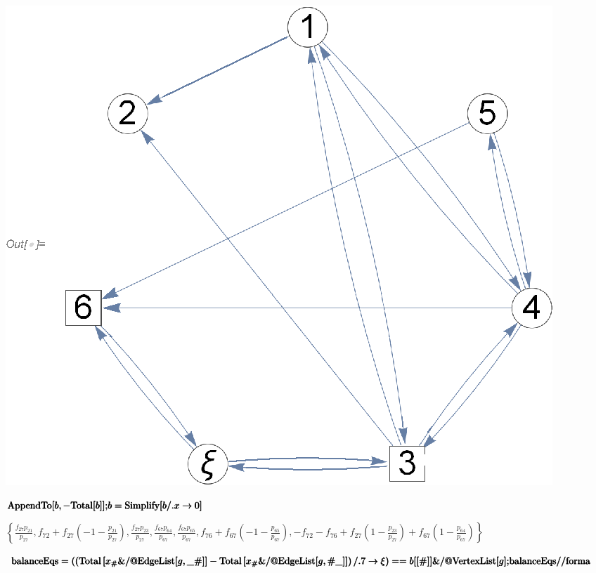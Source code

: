 \documentclass{article}
\newcommand{\unicode}[1]{{}}
\begin{document}
\includegraphics{k1_gr8.eps}

\begin{doublespace}
\noindent\(\pmb{\text{AppendTo}[b,-\text{Total}[b]];}\\
\pmb{b=\text{Simplify}[b\text{/.}x\to 0]}\)
\end{doublespace}

\begin{doublespace}
\noindent\(\left\{\frac{f_{2\unicode{f3d5}7} p_{2\unicode{f3d5}1}}{p_{2\unicode{f3d5}7}},f_{7\unicode{f3d5}2}+f_{2\unicode{f3d5}7} \left(-1-\frac{p_{2\unicode{f3d5}1}}{p_{2\unicode{f3d5}7}}\right),\frac{f_{2\unicode{f3d5}7}
p_{2\unicode{f3d5}3}}{p_{2\unicode{f3d5}7}},\frac{f_{6\unicode{f3d5}7} p_{6\unicode{f3d5}4}}{p_{6\unicode{f3d5}7}},\frac{f_{6\unicode{f3d5}7} p_{6\unicode{f3d5}5}}{p_{6\unicode{f3d5}7}},f_{7\unicode{f3d5}6}+f_{6\unicode{f3d5}7}
\left(-1-\frac{p_{6\unicode{f3d5}5}}{p_{6\unicode{f3d5}7}}\right),-f_{7\unicode{f3d5}2}-f_{7\unicode{f3d5}6}+f_{2\unicode{f3d5}7} \left(1-\frac{p_{2\unicode{f3d5}3}}{p_{2\unicode{f3d5}7}}\right)+f_{6\unicode{f3d5}7}
\left(1-\frac{p_{6\unicode{f3d5}4}}{p_{6\unicode{f3d5}7}}\right)\right\}\)
\end{doublespace}

\begin{doublespace}
\noindent\(\pmb{\text{balanceEqs}=\left(\left(\text{Total}\left[x_{\#}\&\text{/@}\text{EdgeList}[g,\_\unicode{f3d5}\#]\right]-\text{Total}\left[x_{\#}\&\text{/@}\text{EdgeList}[g,\#\unicode{f3d5}\_]\right]\right)\text{/.}
7\to \xi \right)==b[[\#]]\&\text{/@}\text{VertexList}[g];}\\
\pmb{\text{balanceEqs}\text{//}\text{forma}}\)
\end{doublespace}
\end{document}
